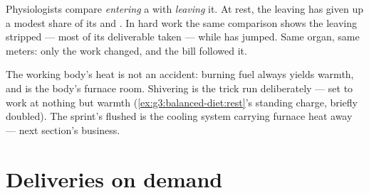 \begin{example}\label{ex:g7:organs-at-work:measure}
Physiologists compare  \emph{entering} a  with
 \emph{leaving} it. At rest, the leaving  has
given up a modest share of its  and . In hard
work the same comparison shows the leaving  stripped
--- most of its deliverable  taken --- while  has jumped. Same organ, same meters: only the work
changed, and the bill followed it.
\end{example}

\begin{remark}\label{rem:g7:organs-at-work:warmth}
The working body's heat is not an accident: burning fuel
always yields warmth, and  is the body's furnace
room. Shivering is the trick run deliberately --- 
set to work at nothing but warmth
(\cref{ex:g3:balanced-diet:rest}'s standing charge, briefly
doubled). The sprint's flushed  is the cooling system
carrying furnace heat away --- next section's business.
\end{remark}

\section{Deliveries on demand}

